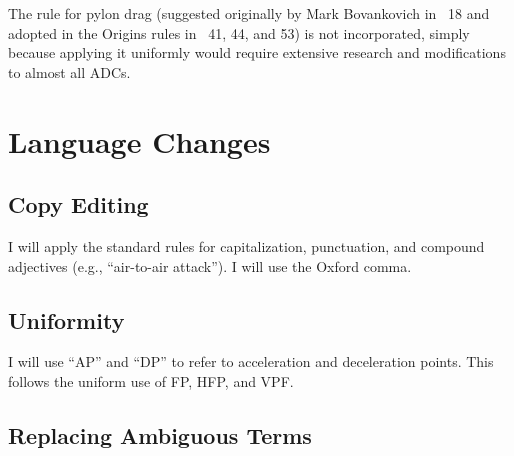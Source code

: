 \documentclass[10pt]{article}
\begin{document}
The rule for pylon drag (suggested originally by Mark Bovankovich in {\APJ}~18 and adopted in the Origins rules in {\APJ}~41, 44, and 53) is not incorporated, simply because applying it uniformly would require extensive research and modifications to almost all ADCs.

\section{Language Changes}

\subsection{Copy Editing}

I will apply the standard rules for capitalization, punctuation, and compound adjectives (e.g., “air-to-air attack”). I will use the Oxford comma.

\subsection{Uniformity}

I will use “AP” and “DP” to refer to acceleration and deceleration points. This follows the uniform use of FP, HFP, and VPF.

\subsection{Replacing Ambiguous Terms}
\end{document}
